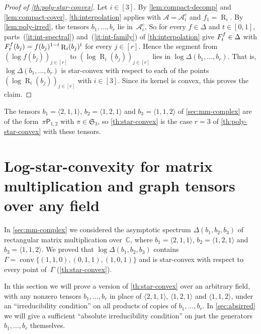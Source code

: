 \documentclass[11pt,letterpaper]{article}
\DeclareMathOperator{\tensorrank}{R}
\newcommand{\polymult}{\mathsf{P}}
\newcommand{\CC}{\mathbb{C}}
\DeclareMathOperator{\conv}{conv}
\begin{document}
\begin{proof}[Proof of \cref{th:poly-star-convex}]
Let $i \in [3]$. By \cref{lem:compact-decomp} and \cref{lem:compact-cover}, \cref{th:interpolation} applies with $\mathcal{A} = \mathcal{A}^{\mathrm{c}}_i$ and $f_1 = \tensorrank_i$. By \cref{lem:poly-irred}, the tensors $b_1, \ldots, b_r$ lie in~$\mathcal{A}^{\mathrm{c}}_i$. So for every $f \in \Delta$ and $t \in [0,1]$, parts~(\ref{it:int-spectral}) and~(\ref{it:int-family}) of \cref{th:interpolation} give $F^{\smash[t]{f}}_t \in \Delta$ with $F^{\smash[t]{f}}_t(b_j) = f(b_j)^{1-t} \tensorrank_i(b_j)^t$ for every $j \in [r]$. Hence the segment from $(\log f(b_j))_{j \in [r]}$ to $(\log \tensorrank_i(b_j))_{j \in [r]}$ lies in $\log \Delta(b_1, \ldots, b_r)$. That is, $\log \Delta(b_1, \ldots, b_r)$ is star-convex with respect to each of the points $(\log \tensorrank_i(b_j))_{j \in [r]}$ with $i \in [3]$. Since its kernel is convex, this proves the claim.
\end{proof}

The tensors $b_1 = \langle 2,1,1 \rangle$, $b_2 = \langle 1,2,1 \rangle$ and $b_3 = \langle 1,1,2 \rangle$ of \cref{sec:mm-complex} are of the form~$\pi\polymult_{1,2}$ with $\pi \in \mathfrak{S}_3$, so \cref{th:star-convex} is the case $r = 3$ of \cref{th:poly-star-convex} with these tensors.

\section{Log-star-convexity for matrix multiplication and graph tensors over any field}
\label{sec:star-convex-any-field}
In \cref{sec:mm-complex} we considered the asymptotic spectrum $\Delta(b_1,b_2,b_3)$ of rectangular matrix multiplication over~$\CC$, where $b_1 = \langle 2,1,1 \rangle$, $b_2 = \langle 1,2,1 \rangle$ and $b_3 = \langle 1,1,2 \rangle$. We proved that $\log \Delta(b_1,b_2,b_3)$ contains $\Gamma = \conv\{(1,1,0), (0,1,1), (1,0,1)\}$ and is star-convex with respect to every point of~$\Gamma$ (\cref{th:star-convex}). 

In this section we will prove a version of \cref{th:star-convex} over an arbitrary field, with any nonzero tensors $b_1, \ldots, b_r$ in place of $\langle 2,1,1 \rangle$, $\langle 1,2,1 \rangle$ and $\langle 1,1,2 \rangle$, under an ``irreducibility condition'' on all products of copies of $b_1, \ldots, b_r$.  In \cref{sec:absirred} we will give a sufficient ``absolute irreducibility condition'' on just the generators $b_1, \ldots, b_r$ themselves. 
\end{document}
